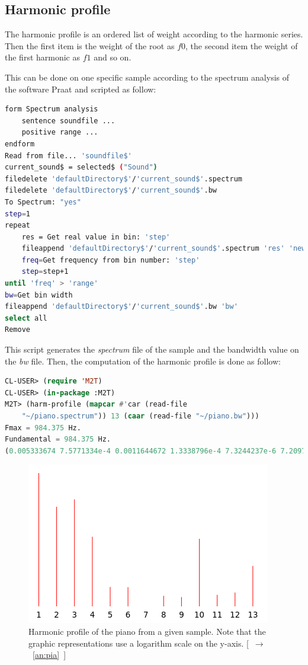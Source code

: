 \subsection{Harmonic profile}

The harmonic profile is an ordered list of weight according to the harmonic series. Then the first item is the weight of the root as $f0$, the second item the weight of the first harmonic as $f1$ and so on.

This can be done on one specific sample according to the spectrum analysis of the software Praat and scripted as follow:

\begin{lstlisting}[language=bash]
form Spectrum analysis
    sentence soundfile ...
    positive range ...
endform
Read from file... 'soundfile$'
current_sound$ = selected$ ("Sound")
filedelete 'defaultDirectory$'/'current_sound$'.spectrum
filedelete 'defaultDirectory$'/'current_sound$'.bw
To Spectrum: "yes"  
step=1
repeat 
    res = Get real value in bin: 'step'
    fileappend 'defaultDirectory$'/'current_sound$'.spectrum 'res' 'newline$'
    freq=Get frequency from bin number: 'step'
    step=step+1
until 'freq' > 'range' 	
bw=Get bin width
fileappend 'defaultDirectory$'/'current_sound$'.bw 'bw' 
select all
Remove
\end{lstlisting}

This script generates the \textsl{spectrum} file of the sample and the bandwidth value on the \textsl{bw} file.
Then, the computation of the harmonic profile is done as follow:

\begin{lstlisting}[language=Lisp]
CL-USER> (require 'M2T)
CL-USER> (in-package :M2T)
M2T> (harm-profile (mapcar #'car (read-file 
    "~/piano.spectrum")) 13 (caar (read-file "~/piano.bw")))
Fmax = 984.375 Hz.
Fundamental = 984.375 Hz.
(0.005333674 7.5771334e-4 0.0011644672 1.3338796e-4 7.3244237e-6 7.2097446e-6 2.3828345e-6 4.374403e-6 4.064216e-6 1.18368014e-4 4.6414575e-6 5.292382e-6 2.4746847e-5)

\end{lstlisting}

\begin{figure}[!hbt]
	\begin{center}
		\includegraphics[scale=0.5]{img/4509}
		\caption{Harmonic profile of the piano from a given sample. Note that the graphic representations use a logarithm scale on the y-axis. \mbox{[ $\rightarrow$ \ref{an:pia} ]}}
		\label{fig:piano}
	\end{center}
\end{figure}

